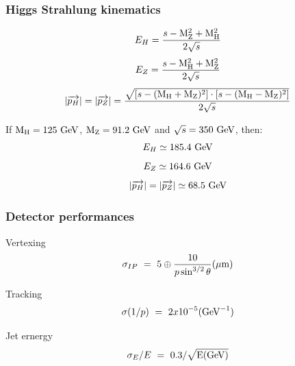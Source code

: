 \documentclass{beamer}
\begin{document}
  \begin{frame}[plain]
    \frametitle{Higgs Strahlung kinematics}

    \[ E_H = \frac{s - \rm{M}_Z^2 + \rm{M}_H^2}{2\sqrt{s}} \]
    \[ E_Z = \frac{s - \rm{M}_H^2 + \rm{M}_Z^2}{2\sqrt{s}} \]
    \[ | \overrightarrow{p_H} | = | \overrightarrow{p_Z} | = \frac{\sqrt{\left[ s - (\rm{M}_H + \rm{M}_Z)^2 \right] \cdot \left[s - (\rm{M}_H - \rm{M}_Z)^2 \right]}}{2\sqrt{s}} \]

    If $\rm{M}_H = 125~\rm{GeV}$, $\rm{M}_Z = 91.2~\rm{GeV}$ and $\sqrt{s} = 350~\rm{GeV}$, then:
    \[ E_H \simeq 185.4~\rm{GeV} \]
    \[ E_Z \simeq 164.6~\rm{GeV} \]
    \[  | \overrightarrow{p_H} | = | \overrightarrow{p_Z} | \simeq 68.5~\rm{GeV}\]

  \end{frame}

  \begin{frame}[plain]
    \frametitle{Detector performances}

    \begin{block}{Vertexing}
      \[ \sigma_{IP} \ = \ 5 \oplus \frac{10}{p\sin^{3/2}\theta} (\mu\rm{m})\]
    \end{block}

    \begin{block}{Tracking}
      \[ \sigma (1/p) \ = \ 2x10^{-5} (\rm{GeV}^{-1})\]
    \end{block}
      
    \begin{block}{Jet ernergy}
      \[\sigma_E / E \ = \ 0.3/\sqrt{\rm{E(GeV)}}\]
    \end{block}

  \end{frame}
\end{document}
